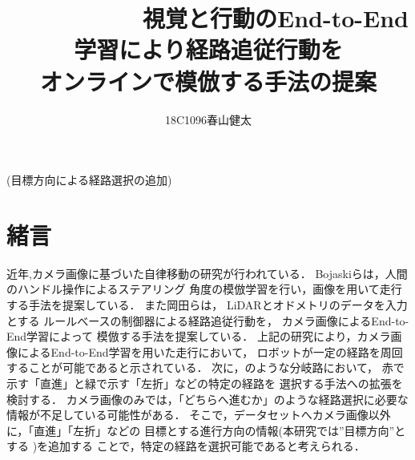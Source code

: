 \documentclass[10pt]{jarticle}
\begin{document}
    
    \makeatletter
  \title{　　　　　　視覚と行動のEnd-to-End学習により経路追従行動を　　　　　　オンラインで模倣する手法の提案}
        {(目標方向による経路選択の追加)}
    
    \author{18C1096\hspace{.5zw}春山健太}
    
    \makeatother
    
    
    \maketitle
    
    
    \section{緒\hspace{2zw}言}%
    近年,カメラ画像に基づいた自律移動の研究が行われている．%
    Bojaskiら\cite{nvidia}は，人間のハンドル操作によるステアリング
    角度の模倣学習を行い，画像を用いて走行する手法を提案している．
    また岡田ら\cite{okada}は，
    LiDARとオドメトリのデータを入力とする
    ルールべースの制御器による経路追従行動を，
    カメラ画像によるEnd-to-End学習によって
    模倣する手法を提案している．
    上記の研究により，カメラ画像によるEnd-to-End学習を用いた走行において，
    ロボットが一定の経路を周回することが可能であると示されている．
    次に，のような分岐路において，
    赤で示す「直進」と緑で示す「左折」などの特定の経路を
    選択する手法への拡張を検討する．
    カメラ画像のみでは，「どちらへ進むか」のような経路選択に必要な情報が不足している可能性がある．
    そこで，データセットへカメラ画像以外に，「直進」「左折」などの
    目標とする進行方向の情報(本研究では”目標方向”とする )を追加する
    ことで，特定の経路を選択可能であると考えられる．
\end{document}
